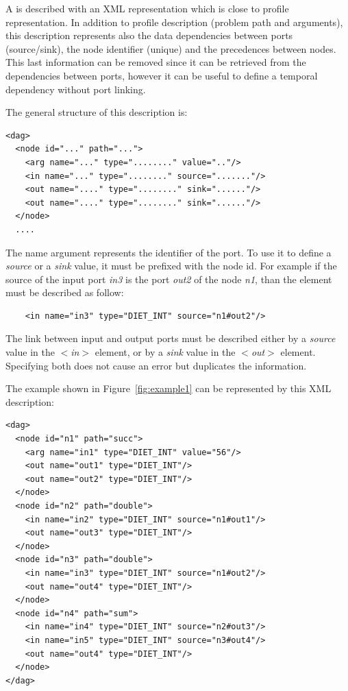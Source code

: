 A \DAG is described with an XML representation which is close to \diet profile
representation. In addition to profile description (problem path and
arguments), this description represents also the data dependencies between
ports (source/sink), the node identifier (unique) and the precedences between
nodes. This last information can be removed since it can be retrieved from the
dependencies between ports, however it can be useful to define a temporal
dependency without port linking.

The general structure of this description is:

\begin{verbatim}
<dag>
  <node id="..." path="...">
    <arg name="..." type="........" value=".."/>
    <in name="..." type="........" source="......."/>
    <out name="...." type="........" sink="......"/>
    <out name="...." type="........" sink="......"/>
  </node>
  ....
\end{verbatim}

The name argument represents the identifier of the port. To use it to define a
\textit{source} or a \textit{sink} value, it must be prefixed with the node
id. For example if the source of the input port \textit{in3} is the port
\textit{out2} of the node \textit{n1}, than the element must be described as
follow:

\begin{verbatim}
    <in name="in3" type="DIET_INT" source="n1#out2"/>
\end{verbatim}

The link between input and output ports must be described either by a
\textit{source} value in the \textit{$<$in$>$} element, or by a \textit{sink} value
in the \textit{$<$out$>$} element. Specifying both does not cause an error but
duplicates the information.

The example shown in Figure~\ref{fig:example1} can be represented by this XML
description:

\begin{verbatim}
<dag>
  <node id="n1" path="succ">
    <arg name="in1" type="DIET_INT" value="56"/>
    <out name="out1" type="DIET_INT"/>
    <out name="out2" type="DIET_INT"/>
  </node>
  <node id="n2" path="double">
    <in name="in2" type="DIET_INT" source="n1#out1"/>
    <out name="out3" type="DIET_INT"/>
  </node>
  <node id="n3" path="double">
    <in name="in3" type="DIET_INT" source="n1#out2"/>
    <out name="out4" type="DIET_INT"/>
  </node>
  <node id="n4" path="sum">
    <in name="in4" type="DIET_INT" source="n2#out3"/>
    <in name="in5" type="DIET_INT" source="n3#out4"/>
    <out name="out4" type="DIET_INT"/>
  </node>
</dag>
\end{verbatim}

